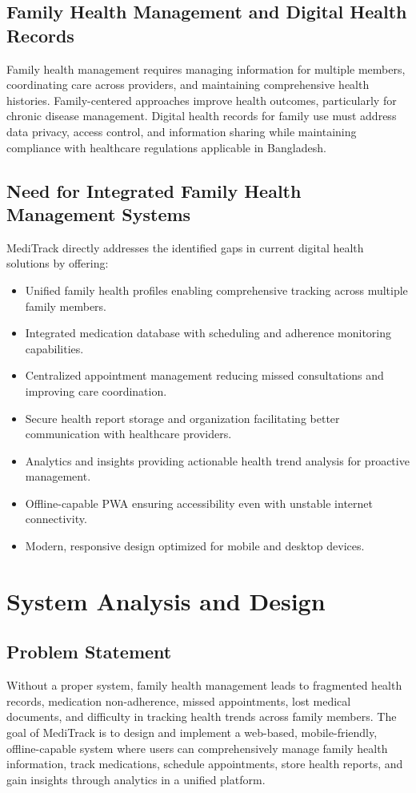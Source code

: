 \documentclass[12pt, a4paper]{report}
\begin{document}
\section{Family Health Management and Digital Health Records}
Family health management requires managing information for multiple members, coordinating care across providers, and maintaining comprehensive health histories. Family-centered approaches improve health outcomes, particularly for chronic disease management. Digital health records for family use must address data privacy, access control, and information sharing while maintaining compliance with healthcare regulations applicable in Bangladesh.

\section{Need for Integrated Family Health Management Systems}
MediTrack directly addresses the identified gaps in current digital health solutions by offering:
\begin{itemize}
    \item Unified family health profiles enabling comprehensive tracking across multiple family members.
    \item Integrated medication database with scheduling and adherence monitoring capabilities.
    \item Centralized appointment management reducing missed consultations and improving care coordination.
    \item Secure health report storage and organization facilitating better communication with healthcare providers.
    \item Analytics and insights providing actionable health trend analysis for proactive management.
    \item Offline-capable PWA ensuring accessibility even with unstable internet connectivity.
    \item Modern, responsive design optimized for mobile and desktop devices.
\end{itemize}

\chapter{System Analysis and Design}

\section{Problem Statement}
Without a proper system, family health management leads to fragmented health records, medication non-adherence, missed appointments, lost medical documents, and difficulty in tracking health trends across family members. The goal of MediTrack is to design and implement a web-based, mobile-friendly, offline-capable system where users can comprehensively manage family health information, track medications, schedule appointments, store health reports, and gain insights through analytics in a unified platform.
\end{document}
